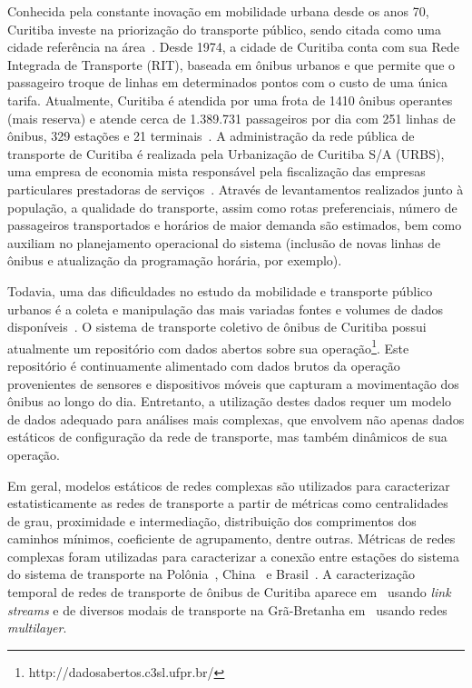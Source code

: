 Conhecida pela constante inovação em mobilidade urbana desde os anos 70, Curitiba investe na priorização do transporte público, sendo citada como uma cidade referência na área~\cite{CWBconhecida}. Desde 1974, a cidade de Curitiba conta com sua Rede Integrada de Transporte (RIT), baseada em ônibus urbanos e que permite que o passageiro troque de linhas em determinados pontos com o custo de uma única tarifa. Atualmente, Curitiba é atendida por uma frota de 1410 ônibus operantes (mais reserva) e atende cerca de 1.389.731 passageiros por dia com 251 linhas de ônibus, 329 estações e 21 terminais~\cite{Cur:19}. 
A administração da rede pública de transporte de Curitiba é realizada pela Urbanização de Curitiba S/A (URBS), uma empresa de economia mista responsável pela fiscalização das empresas particulares prestadoras de serviços~\cite{URBS}. Através de levantamentos realizados junto à população, a qualidade do transporte, assim como rotas preferenciais, número de passageiros transportados e horários de maior demanda são estimados, bem como auxiliam no planejamento operacional do sistema (inclusão de novas linhas de ônibus e atualização da programação horária, por exemplo).
 
Todavia, uma das dificuldades no estudo da mobilidade e transporte público urbanos é a coleta e manipulação das mais variadas fontes e volumes de dados disponíveis~\cite{wes:17}. O sistema de transporte coletivo de ônibus de Curitiba possui atualmente um repositório com dados abertos sobre sua operação\footnote{http://dadosabertos.c3sl.ufpr.br/}. Este repositório é continuamente alimentado com dados brutos da operação provenientes de sensores e dispositivos móveis que capturam a movimentação dos ônibus ao longo do dia. Entretanto, a utilização destes dados requer um modelo de dados adequado para análises mais complexas, que envolvem não apenas dados estáticos de configuração da rede de transporte, mas também dinâmicos de sua operação.

 
Em geral, modelos estáticos de redes complexas são utilizados para caracterizar estatisticamente as redes de transporte a partir de métricas como centralidades de grau, proximidade e intermediação, distribuição dos comprimentos dos caminhos mínimos, coeficiente de agrupamento, dentre outras. Métricas de redes complexas foram utilizadas para caracterizar a conexão entre estações do sistema do sistema de transporte na Polônia~\cite{Sienkiewicz2005}, China~\cite{Xu2013} e Brasil~\cite{Izawa2017}. A caracterização temporal de redes de transporte de ônibus de Curitiba aparece em~\cite{curz:19} usando \emph{link streams} e de diversos modais de transporte na Grã-Bretanha em~\cite{Gallotti2015} usando redes \emph{multilayer}.


